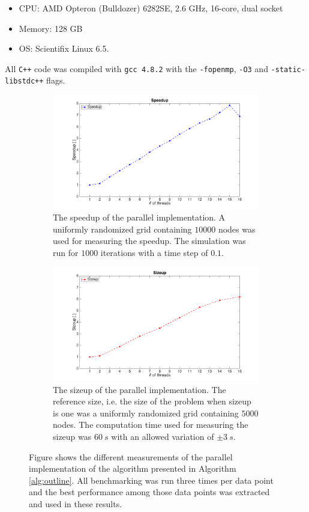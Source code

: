 \begin{itemize}
\item CPU: AMD Opteron (Bulldozer) 6282SE, 2.6 GHz, 16-core, dual socket
\item Memory: 128 GB
\item OS: Scientifix Linux 6.5.
\end{itemize}

\noindent All \texttt{C++} code was compiled with \texttt{gcc 4.8.2} with the \texttt{-fopenmp}, \texttt{-O3} and  \texttt{-static-libstdc++} flags.

\begin{figure}
\centering
\begin{subfigure}[b]{1\textwidth}
\includegraphics[width=\textwidth, height=0.5\textwidth]{img/speedup.png}
\caption{The speedup of the parallel implementation. A uniformly randomized grid containing $10000$ nodes was used for measuring the speedup. The simulation was run for $1000$ iterations with a time step of $0.1$.}
\end{subfigure}

\begin{subfigure}[b]{1\textwidth}
\includegraphics[width=\textwidth, height=0.5\textwidth]{img/sizeup.png}
\caption{The sizeup of the parallel implementation. The reference size, i.e. the size of the problem when sizeup is one was a uniformly randomized grid containing $5000$ nodes. The computation time used for measuring the sizeup was $60~s$ with an allowed variation of $\pm 3~s$. }
\end{subfigure}
\caption{Figure shows the different measurements of the parallel implementation of the algorithm presented in Algorithm \ref{alg:outline}. All benchmarking was run three times per data point and the best performance among those data points was extracted and used in these results.}
\label{fig:speed_size}
\end{figure}


